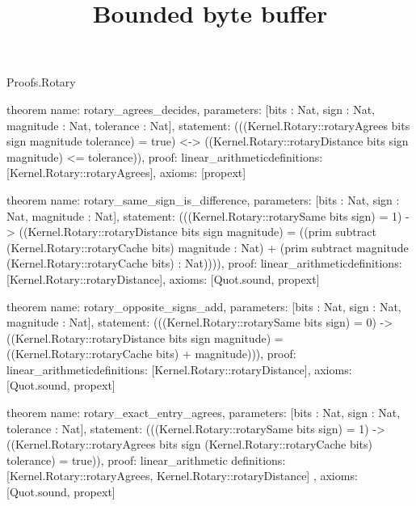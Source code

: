 \begin{lexlean}{Proofs.Rotary}
\title{Bounded byte buffer}
\begin{semanticmodule}
theorem{
  name: rotary_agrees_decides,
  parameters: [bits : Nat, sign : Nat, magnitude : Nat, tolerance : Nat],
  statement: (((Kernel.Rotary::rotaryAgrees bits sign magnitude tolerance) = true) <-> ((Kernel.Rotary::rotaryDistance bits sign magnitude) <= tolerance)),
  proof: linear_arithmetic{definitions: [Kernel.Rotary::rotaryAgrees]},
  axioms: [propext]
}

theorem{
  name: rotary_same_sign_is_difference,
  parameters: [bits : Nat, sign : Nat, magnitude : Nat],
  statement: (((Kernel.Rotary::rotarySame bits sign) = 1) -> ((Kernel.Rotary::rotaryDistance bits sign magnitude) = ((prim subtract (Kernel.Rotary::rotaryCache bits) magnitude : Nat) + (prim subtract magnitude (Kernel.Rotary::rotaryCache bits) : Nat)))),
  proof: linear_arithmetic{definitions: [Kernel.Rotary::rotaryDistance]},
  axioms: [Quot.sound, propext]
}

theorem{
  name: rotary_opposite_signs_add,
  parameters: [bits : Nat, sign : Nat, magnitude : Nat],
  statement: (((Kernel.Rotary::rotarySame bits sign) = 0) -> ((Kernel.Rotary::rotaryDistance bits sign magnitude) = ((Kernel.Rotary::rotaryCache bits) + magnitude))),
  proof: linear_arithmetic{definitions: [Kernel.Rotary::rotaryDistance]},
  axioms: [Quot.sound, propext]
}

theorem{
  name: rotary_exact_entry_agrees,
  parameters: [bits : Nat, sign : Nat, tolerance : Nat],
  statement: (((Kernel.Rotary::rotarySame bits sign) = 1) -> ((Kernel.Rotary::rotaryAgrees bits sign (Kernel.Rotary::rotaryCache bits) tolerance) = true)),
  proof: linear_arithmetic{
    definitions: [Kernel.Rotary::rotaryAgrees, Kernel.Rotary::rotaryDistance]
  },
  axioms: [Quot.sound, propext]
}
\end{semanticmodule}
\end{lexlean}
